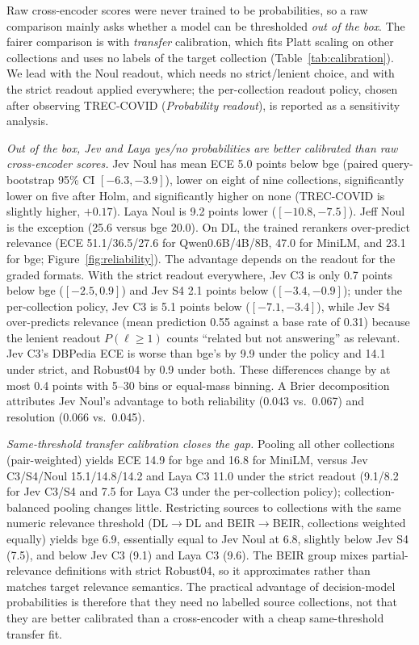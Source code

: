 Raw cross-encoder scores were never trained to be probabilities, so a raw comparison mainly asks whether a model can be thresholded \emph{out of the box}. The fairer comparison is with \emph{transfer} calibration, which fits Platt scaling on other collections and uses no labels of the target collection (Table~\ref{tab:calibration}). We lead with the Noul readout, which needs no strict/lenient choice, and with the strict readout applied everywhere; the per-collection readout policy, chosen after observing TREC-COVID (\emph{Probability readout}), is reported as a sensitivity analysis.

\emph{Out of the box, Jev and Laya yes/no probabilities are better calibrated than raw cross-encoder scores.}
Jev Noul has mean ECE 5.0 points below bge (paired query-bootstrap 95\% CI $[-6.3,-3.9]$), lower on eight of nine collections, significantly lower on five after Holm, and significantly higher on none (TREC-COVID is slightly higher, $+0.17$). Laya Noul is 9.2 points lower ($[-10.8,-7.5]$). Jeff Noul is the exception (25.6 versus bge 20.0). On DL, the trained rerankers over-predict relevance (ECE 51.1/36.5/27.6 for Qwen0.6B/4B/8B, 47.0 for MiniLM, and 23.1 for bge; Figure~\ref{fig:reliability}).
The advantage depends on the readout for the graded formats. With the strict readout everywhere, Jev C3 is only 0.7 points below bge ($[-2.5,0.9]$) and Jev S4 2.1 points below ($[-3.4,-0.9]$); under the per-collection policy, Jev C3 is 5.1 points below ($[-7.1,-3.4]$), while Jev S4 over-predicts relevance (mean prediction 0.55 against a base rate of 0.31) because the lenient readout $P(\ell\ge1)$ counts ``related but not answering'' as relevant. Jev C3's DBPedia ECE is worse than bge's by 9.9 under the policy and 14.1 under strict, and Robust04 by 0.9 under both.
These differences change by at most 0.4 points with 5--30 bins or equal-mass binning. A Brier decomposition attributes Jev Noul's advantage to both reliability (0.043 vs.\ 0.067) and resolution (0.066 vs.\ 0.045).

\emph{Same-threshold transfer calibration closes the gap.}
Pooling all other collections (pair-weighted) yields ECE 14.9 for bge and 16.8 for MiniLM, versus Jev C3/S4/Noul 15.1/14.8/14.2 and Laya C3 11.0 under the strict readout (9.1/8.2 for Jev C3/S4 and 7.5 for Laya C3 under the per-collection policy); collection-balanced pooling changes little. Restricting sources to collections with the same numeric relevance threshold (DL$\to$DL and BEIR$\to$BEIR, collections weighted equally) yields bge 6.9, essentially equal to Jev Noul at 6.8, slightly below Jev S4 (7.5), and below Jev C3 (9.1) and Laya C3 (9.6). The BEIR group mixes partial-relevance definitions with strict Robust04, so it approximates rather than matches target relevance semantics.
The practical advantage of decision-model probabilities is therefore that they need no labelled source collections, not that they are better calibrated than a cross-encoder with a cheap same-threshold transfer fit.

